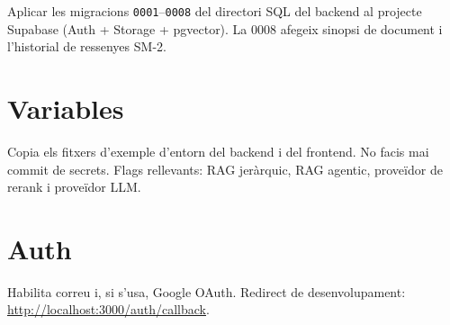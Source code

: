 Aplicar les migracions \texttt{0001}--\texttt{0008} del directori SQL del backend al projecte Supabase (Auth + Storage + pgvector). La 0008 afegeix sinopsi de document i l'historial de ressenyes SM-2.

\section{Variables}

Copia els fitxers d'exemple d'entorn del backend i del frontend. No facis mai commit de secrets. Flags rellevants: RAG jeràrquic, RAG agentic, proveïdor de rerank i proveïdor LLM.

\section{Auth}

Habilita correu i, si s'usa, Google OAuth. Redirect de desenvolupament: \url{http://localhost:3000/auth/callback}.
